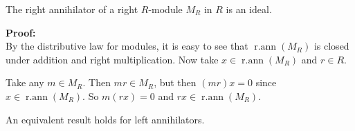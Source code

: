 \documentclass[12pt]{article}
\begin{document}

The right annihilator of a right $R$-module $M_R$ in $R$ is an ideal.

{\bf Proof:}\\
By the distributive law for modules, it is easy to see that $\operatorname{r.ann}(M_R)$ is closed under addition and right multiplication.
Now take $x \in \operatorname{r.ann}(M_R)$ and $r \in R$.

Take any $m \in M_R$.  Then $mr \in M_R$, but then $(mr)x = 0$ since $x \in \operatorname{r.ann}(M_R)$.  So $m(rx)=0$ and $rx \in \operatorname{r.ann}(M_R)$.

An equivalent result holds for left annihilators.
\end{document}
